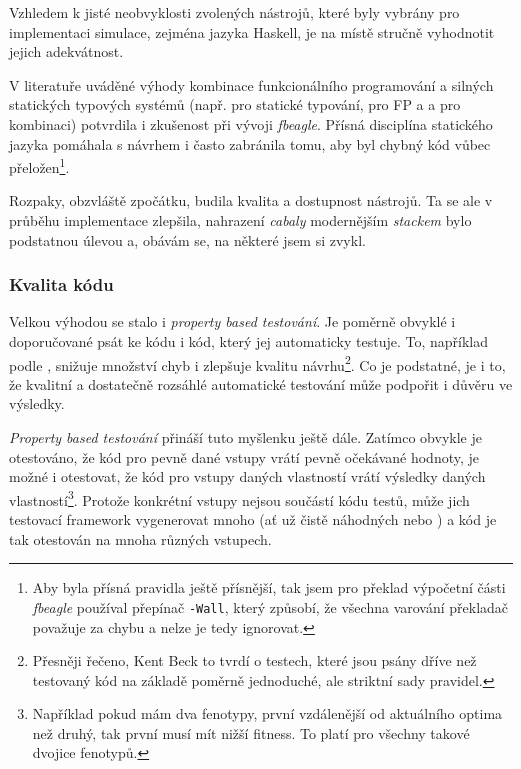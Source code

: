 \begin{tcolorbox}[ title={Vhodnost zvolených nástrojů pro simulaci}
                 , breakable
                 ]

Vzhledem k jisté neobvyklosti zvolených nástrojů, které byly vybrány pro implementaci simulace, zejména jazyka Haskell,
je na místě stručně vyhodnotit jejich adekvátnost.

V literatuře uváděné výhody kombinace funkcionálního programování a silných statických typových systémů (např. \citet{meijer2004static} pro
statické typování, \citet{hughes1989functional} pro FP a \citet{Chiusano2016} a \citet{ray2014large} pro kombinaci)
potvrdila i zkušenost při vývoji
\textit{fbeagle}. Přísná disciplína statického jazyka pomáhala s návrhem i často zabránila tomu, aby byl chybný kód vůbec přeložen\footnote{
Aby byla přísná pravidla ještě přísnější, tak jsem pro překlad výpočetní části \textit{fbeagle} používal přepínač \texttt{-Wall}, který způsobí,
že všechna varování překladač považuje za chybu a nelze je tedy ignorovat.
}.

Rozpaky, obzvláště zpočátku, budila kvalita a dostupnost nástrojů. Ta se ale v průběhu implementace zlepšila, nahrazení \textit{cabaly} modernějším
\textit{stackem} bylo podstatnou úlevou a, obávám se, na některé  jsem si zvykl.

\subsubsection*{Kvalita kódu}

Velkou výhodou se stalo i \textit{property based testování}. Je poměrně obvyklé i doporučované \citep{williams2009effectiveness} psát ke kódu i kód, který jej
automaticky testuje. To, například podle \citet{beck2003test}, snižuje množství chyb i zlepšuje kvalitu návrhu\footnote{
Přesněji řečeno, Kent Beck to tvrdí o testech, které jsou psány dříve než testovaný kód na základě poměrně jednoduché,
ale striktní sady pravidel.}.
Co je podstatné, je i to, že kvalitní a dostatečně rozsáhlé automatické testování může podpořit i důvěru ve výsledky.

\textit{Property based testování} přináší tuto myšlenku ještě dále. Zatímco obvykle je otestováno, že kód pro pevně dané vstupy vrátí pevně
očekávané hodnoty, je možné i otestovat, že kód pro vstupy daných vlastností vrátí výsledky daných vlastností\footnote{
Například pokud mám dva fenotypy, první vzdálenější od aktuálního optima než druhý, tak první musí mít nižší fitness.
To platí pro všechny takové dvojice fenotypů.
}. Protože konkrétní vstupy nejsou součástí kódu testů, může jich testovací framework vygenerovat mnoho (ať už čistě náhodných nebo )
a kód je tak otestován na mnoha různých vstupech.


\end{tcolorbox}
